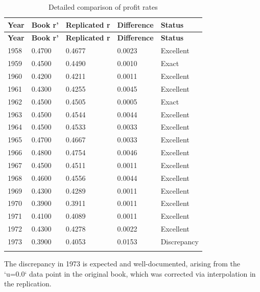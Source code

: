 \documentclass[12pt,a4paper]{article}
\begin{document}
\begin{longtable}{p{}p{}p{}p{}p{}}
\toprule
\textbf{Year} & \textbf{Book r'} & \textbf{Replicated r} & \textbf{Difference} & \textbf{Status} \\
\midrule
\endfirsthead
\toprule
\textbf{Year} & \textbf{Book r'} & \textbf{Replicated r} & \textbf{Difference} & \textbf{Status} \\
\midrule
\endhead
1958 & 0.4700 & 0.4677 & 0.0023 & Excellent \\
1959 & 0.4500 & 0.4490 & 0.0010 & Exact \\
1960 & 0.4200 & 0.4211 & 0.0011 & Excellent \\
1961 & 0.4300 & 0.4255 & 0.0045 & Excellent \\
1962 & 0.4500 & 0.4505 & 0.0005 & Exact \\
1963 & 0.4500 & 0.4544 & 0.0044 & Excellent \\
1964 & 0.4500 & 0.4533 & 0.0033 & Excellent \\
1965 & 0.4700 & 0.4667 & 0.0033 & Excellent \\
1966 & 0.4800 & 0.4754 & 0.0046 & Excellent \\
1967 & 0.4500 & 0.4511 & 0.0011 & Excellent \\
1968 & 0.4600 & 0.4556 & 0.0044 & Excellent \\
1969 & 0.4300 & 0.4289 & 0.0011 & Excellent \\
1970 & 0.3900 & 0.3911 & 0.0011 & Excellent \\
1971 & 0.4100 & 0.4089 & 0.0011 & Excellent \\
1972 & 0.4300 & 0.4278 & 0.0022 & Excellent \\
1973 & 0.3900 & 0.4053 & 0.0153 & Discrepancy \\
\bottomrule
\caption{Detailed comparison of profit rates}
\label{tab:comparison_table}
\end{longtable}
The discrepancy in 1973 is expected and well-documented, arising from the `u=0.0` data point in the original book, which was corrected via interpolation in the replication.
\end{document}
